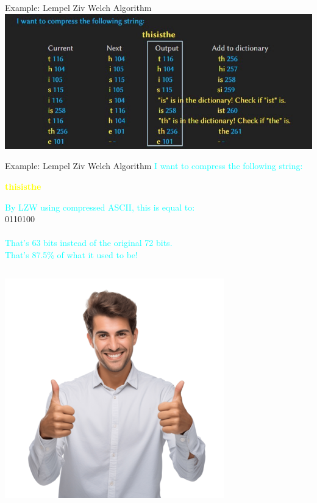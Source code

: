 \documentclass{beamer}
\begin{document}
\begin{frame}{Example: Lempel Ziv Welch Algorithm}
    \includegraphics[scale=0.5]{assets/bypass.png}
\end{frame}
\begin{frame}{Example: Lempel Ziv Welch Algorithm}
        \textcolor{cyan}{
        I want to compress the following string: \\
    }
    \textcolor{yellow}{
        \begin{center}
             \textbf{\large thisisthe} \\  
        \end{center}
    }
    \textcolor{cyan}{
        By LZW using compressed ASCII, this is equal to: \\
    }
        0110100      \\
         \quad{} \quad\quad{} \quad\quad{} \qquad{} \qquad{} \\
    \textcolor{cyan}{That's 63 bits instead of the original 72 bits.}\\
    \textcolor{cyan}{That's 87.5\% of what it used to be!}\\
    \begin{columns}
        \hfill
        \includegraphics[scale=0.4]{assets/thumbs_up.png}
    \end{columns}
\end{frame}
\end{document}
